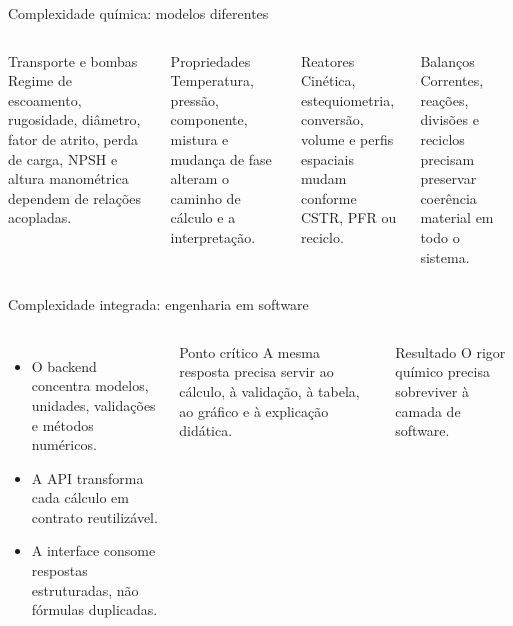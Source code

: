 
\begin{frame}{Complexidade química: modelos diferentes}
  \small
  \begin{columns}[T,onlytextwidth]
      \begin{block}{Transporte e bombas}
        Regime de escoamento, rugosidade, diâmetro, fator de atrito, perda de carga, NPSH e altura manométrica dependem de relações acopladas.
      \end{block}
      \begin{block}{Propriedades}
        Temperatura, pressão, componente, mistura e mudança de fase alteram o caminho de cálculo e a interpretação.
      \end{block}
      \begin{block}{Reatores}
        Cinética, estequiometria, conversão, volume e perfis espaciais mudam conforme CSTR, PFR ou reciclo.
      \end{block}
      \begin{block}{Balanços}
        Correntes, reações, divisões e reciclos precisam preservar coerência material em todo o sistema.
      \end{block}
  \end{columns}
\end{frame}

\begin{frame}{Complexidade integrada: engenharia em software}
  \begin{columns}[T,onlytextwidth]
      \begin{itemize}
        \item O backend concentra modelos, unidades, validações e métodos numéricos.
        \item A API transforma cada cálculo em contrato reutilizável.
        \item A interface consome respostas estruturadas, não fórmulas duplicadas.
      \end{itemize}
      \begin{block}{Ponto crítico}
        A mesma resposta precisa servir ao cálculo, à validação, à tabela, ao gráfico e à explicação didática.
      \end{block}
      \begin{alertblock}{Resultado}
        O rigor químico precisa sobreviver à camada de software.
      \end{alertblock}
  \end{columns}
\end{frame}

